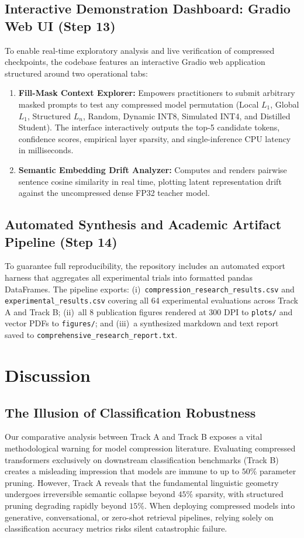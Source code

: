 \documentclass[conference]{IEEEtran}
\begin{document}
\subsection{Interactive Demonstration Dashboard: Gradio Web UI (Step 13)}
To enable real-time exploratory analysis and live verification of compressed checkpoints, the codebase features an interactive Gradio web application structured around two operational tabs:
\begin{enumerate}
    \item \textbf{Fill-Mask Context Explorer:} Empowers practitioners to submit arbitrary masked prompts to test any compressed model permutation (Local $L_1$, Global $L_1$, Structured $L_n$, Random, Dynamic INT8, Simulated INT4, and Distilled Student). The interface interactively outputs the top-5 candidate tokens, confidence scores, empirical layer sparsity, and single-inference CPU latency in milliseconds.
    \item \textbf{Semantic Embedding Drift Analyzer:} Computes and renders pairwise sentence cosine similarity in real time, plotting latent representation drift against the uncompressed dense FP32 teacher model.
\end{enumerate}

\subsection{Automated Synthesis and Academic Artifact Pipeline (Step 14)}
To guarantee full reproducibility, the repository includes an automated export harness that aggregates all experimental trials into formatted pandas DataFrames. The pipeline exports: (i)~\texttt{compression\_research\_results.csv} and \texttt{experimental\_results.csv} covering all 64 experimental evaluations across Track A and Track B; (ii)~all 8 publication figures rendered at 300 DPI to \texttt{plots/} and vector PDFs to \texttt{figures/}; and (iii)~a synthesized markdown and text report saved to \texttt{comprehensive\_research\_report.txt}.

\section{Discussion}
\subsection{The Illusion of Classification Robustness}
Our comparative analysis between Track A and Track B exposes a vital methodological warning for model compression literature. Evaluating compressed transformers exclusively on downstream classification benchmarks (Track B) creates a misleading impression that models are immune to up to $50\%$ parameter pruning. However, Track A reveals that the fundamental linguistic geometry undergoes irreversible semantic collapse beyond $45\%$ sparsity, with structured pruning degrading rapidly beyond $15\%$. When deploying compressed models into generative, conversational, or zero-shot retrieval pipelines, relying solely on classification accuracy metrics risks silent catastrophic failure.
\end{document}
